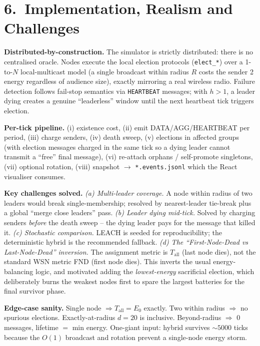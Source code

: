 \documentclass[a4paper,10pt]{article}
\begin{document}
\vspace{-0.4em}
\section*{6.\ Implementation, Realism and Challenges}
\vspace{-0.4em}
\textbf{Distributed-by-construction.} The simulator is strictly distributed: there is no centralised oracle.
Nodes execute the local election protocols (\texttt{elect\_*}) over a 1-to-$N$ local-multicast model
(a single broadcast within radius $R$ costs the sender 2 energy regardless of audience size), exactly
mirroring a real wireless radio. Failure detection follows fail-stop semantics via \texttt{HEARTBEAT} messages;
with $h{>}1$, a leader dying creates a genuine ``leaderless'' window until the next heartbeat tick triggers election.

\textbf{Per-tick pipeline.} (i) existence cost, (ii) emit DATA/AGG/HEARTBEAT per period, (iii) charge senders,
(iv) death sweep, (v) elections in affected groups (with election messages charged in the same tick so a dying
leader cannot transmit a ``free'' final message), (vi) re-attach orphans / self-promote singletons, (vii) optional
rotation, (viii) snapshot $\to$ \texttt{*.events.jsonl} which the React visualiser consumes.

\textbf{Key challenges solved.}
\textit{(a) Multi-leader coverage.} A node within radius of two leaders would break single-membership; resolved
by nearest-leader tie-break plus a global ``merge close leaders'' pass.
\textit{(b) Leader dying mid-tick.} Solved by charging senders \emph{before} the death sweep -- the dying leader
pays for the message that killed it.
\textit{(c) Stochastic comparison.} LEACH is seeded for reproducibility; the deterministic hybrid is the recommended fallback.
\textit{(d) The ``First-Node-Dead vs Last-Node-Dead'' inversion.} The assignment metric is $T_{\text{all}}$ (last node dies),
not the standard WSN metric FND (first node dies). This inverts the usual energy-balancing logic, and motivated
adding the \textit{lowest-energy} sacrificial election, which deliberately burns the weakest nodes first to spare
the largest batteries for the final survivor phase.

\textbf{Edge-case sanity.} Single node $\Rightarrow T_{\text{all}}=E_0$ exactly. Two within radius $\Rightarrow$ no spurious elections.
Exactly-at-radius $d{=}20$ is inclusive. Beyond-radius $\Rightarrow$ $0$ messages, lifetime $=$ min energy.
One-giant input: hybrid survives $\sim\!5000$ ticks because the $O(1)$ broadcast and rotation prevent a single-node energy storm.
\end{document}
